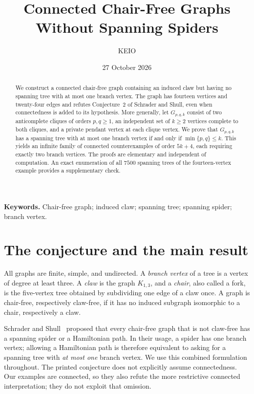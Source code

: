 \documentclass[11pt]{article}
\title{Connected Chair-Free Graphs\\Without Spanning Spiders}
\author{KEIO}
\date{27 October 2026}
\theoremstyle{remark}
\begin{document}
\maketitle

\begin{abstract}
We construct a connected chair-free graph containing an induced claw but having no spanning tree with at most one branch vertex. The graph has fourteen vertices and twenty-four edges and refutes Conjecture~2 of Schrader and Shull, even when connectedness is added to its hypothesis. More generally, let $G_{p,q,k}$ consist of two anticomplete cliques of orders $p,q\geq1$, an independent set of $k\geq2$ vertices complete to both cliques, and a private pendant vertex at each clique vertex. We prove that $G_{p,q,k}$ has a spanning tree with at most one branch vertex if and only if $\min\{p,q\}\leq k$. This yields an infinite family of connected counterexamples of order $5k+4$, each requiring exactly two branch vertices. The proofs are elementary and independent of computation. An exact enumeration of all $7500$ spanning trees of the fourteen-vertex example provides a supplementary check.
\end{abstract}

\noindent\textbf{Keywords.} Chair-free graph; induced claw; spanning tree; spanning spider; branch vertex.

\section{The conjecture and the main result}

All graphs are finite, simple, and undirected. A \emph{branch vertex} of a tree is a vertex of degree at least three. A \emph{claw} is the graph $K_{1,3}$, and a \emph{chair}, also called a fork, is the five-vertex tree obtained by subdividing one edge of a claw once. A graph is chair-free, respectively claw-free, if it has no induced subgraph isomorphic to a chair, respectively a claw.

Schrader and Shull~\cite[Conjecture~2]{SS2025} proposed that every chair-free graph that is not claw-free has a spanning spider or a Hamiltonian path. In their usage, a spider has one branch vertex; allowing a Hamiltonian path is therefore equivalent to asking for a spanning tree with \emph{at most one} branch vertex. We use this combined formulation throughout. The printed conjecture does not explicitly assume connectedness. Our examples are connected, so they also refute the more restrictive connected interpretation; they do not exploit that omission.
\end{document}
